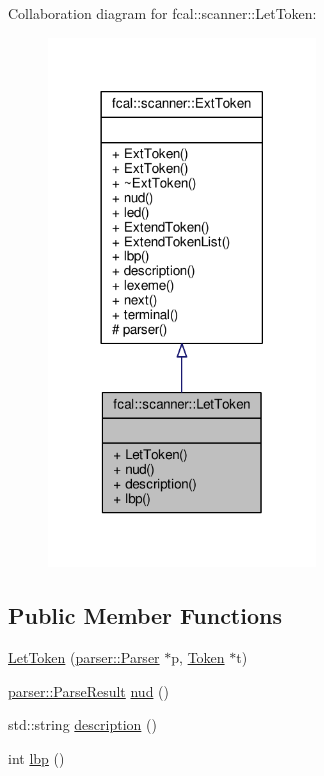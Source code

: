 Collaboration diagram for fcal\+:\+:scanner\+:\+:Let\+Token\+:
\nopagebreak
\begin{figure}[H]
\begin{center}
\leavevmode
\includegraphics[width=201pt]{classfcal_1_1scanner_1_1LetToken__coll__graph}
\end{center}
\end{figure}
\subsection*{Public Member Functions}
\begin{DoxyCompactItemize}
\item 
\hyperlink{classfcal_1_1scanner_1_1LetToken_ad9897630e641c116602af17066086bf0}{Let\+Token} (\hyperlink{classfcal_1_1parser_1_1Parser}{parser\+::\+Parser} $\ast$p, \hyperlink{classfcal_1_1scanner_1_1Token}{Token} $\ast$t)
\item 
\hyperlink{classfcal_1_1parser_1_1ParseResult}{parser\+::\+Parse\+Result} \hyperlink{classfcal_1_1scanner_1_1LetToken_a020d102d24a3bda7bddec7e6ccbb7f01}{nud} ()
\item 
std\+::string \hyperlink{classfcal_1_1scanner_1_1LetToken_aabb7ae69eea2ce5e179c26a72a479aa9}{description} ()
\item 
int \hyperlink{classfcal_1_1scanner_1_1LetToken_abefbfa2c420b3e1214b85849d0db2e43}{lbp} ()
\end{DoxyCompactItemize}
